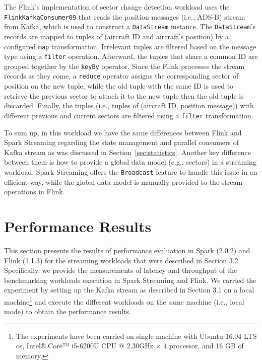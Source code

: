 \documentclass[]{article}
\begin{document}
\begin{itemize}
 The Flink's implementation of sector change detection workload uses the \texttt{FlinkKafkaConsumer09} that reads the position messages (i.e., ADS-B) stream from Kafka, which is used to construct a \texttt{DataStream} instance. The \texttt{DataStream}'s records are mapped to tuples of (aircraft ID and aircraft's position) by a configured \texttt{map} transformation. Irrelevant tuples are filtered based on the message type using a \texttt{filter} operation. Afterward, the tuples that share a common ID are grouped together by the \texttt{keyBy} operator. Since the Flink processes the stream records as they come, a \texttt{reduce} operator assigns the corresponding sector of position on the new tuple, while the old tuple with the same ID is used to retrieve the previous sector to attach it to the new tuple then the old tuple is discarded. Finally, the tuples (i.e., tuples of (aircraft ID, position message)) with different previous and current sectors are filtered using a \texttt{filter} transformation.

 \end{itemize}
 
 
 \par To sum up, in this workload we have the  same differences between Flink and Spark Streaming regarding the state management and parallel  consumers of Kafka stream as was discussed in Section~\ref{sec:statistics}. Another key difference between them is how  to provide a global data model (e.g., sectors) in a streaming workload. Spark Streaming offers the \texttt{Broadcast} feature to handle this issue in an efficient way, while the global data model is manually provided  to the stream operations in Flink.
\section{Performance Results}
\label{sec:sec4}
\par This section presents the results of performance evaluation in Spark (2.0.2) and Flink (1.1.3) for the streaming workloads that were described in Section 3.2. Specifically, we provide  the measurements of latency and throughput of the benchmarking workloads execution in Spark Streaming and Flink. We carried the experiment by setting up the Kafka stream as described in Section 3.1 on a local machine\footnote{ The experiments have been carried  on single machine with Ubuntu 16.04 LTS os, Intel® Core™ i5-6200U CPU @ 2.30GHz × 4  processor, and 16 GB of memory.} and execute the different workloads on the same machine (i.e., local mode) to obtain the performance results.  
\end{document}
